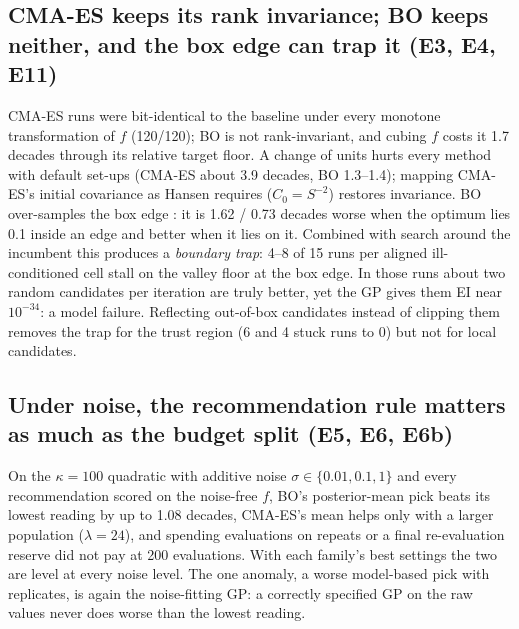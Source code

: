\documentclass[10pt,a4paper]{article}
\begin{document}
\subsection{CMA-ES keeps its rank invariance; BO keeps neither, and the box edge can trap it (E3, E4, E11)}
CMA-ES runs were bit-identical to the baseline under every monotone
transformation of $f$ (120/120); BO is not rank-invariant, and cubing $f$ costs it 1.7 decades through its relative
target floor. A change of units hurts every method with default set-ups (CMA-ES about 3.9 decades, BO 1.3--1.4);
mapping CMA-ES's initial covariance as Hansen requires ($C_0=S^{-2}$) restores invariance. BO over-samples the box
edge \citep{siivola2018boundary}: it is 1.62 / 0.73 decades worse when the optimum lies 0.1 inside an edge and better
when it lies on it. Combined with search around the incumbent this produces a \emph{boundary trap}: 4--8 of 15 runs per
aligned ill-conditioned cell stall on the valley floor at the box edge. In those runs about two random candidates per
iteration are truly better, yet the GP gives them EI near $10^{-34}$: a model failure. Reflecting out-of-box
candidates instead of clipping them removes the trap for the trust region (6 and 4 stuck runs to 0) but not for local
candidates.

\subsection{Under noise, the recommendation rule matters as much as the budget split (E5, E6, E6b)}
On the $\kappa=100$ quadratic with additive noise $\sigma\in\{0.01,0.1,1\}$ and every recommendation
scored on the noise-free $f$, BO's posterior-mean pick beats its lowest reading by up to 1.08 decades, CMA-ES's mean
helps only with a larger population ($\lambda=24$), and spending evaluations on repeats or a final re-evaluation
reserve did not pay at 200 evaluations. With each family's best settings the two are level at every noise level.
The one anomaly, a worse model-based pick with replicates, is again the noise-fitting GP: a correctly specified GP
on the raw values never does worse than the lowest reading.
\end{document}
